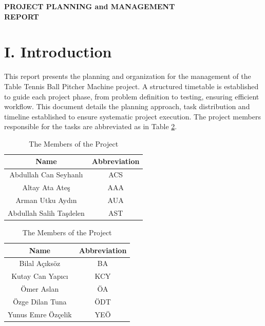 \documentclass[12pt]{article}
\begin{document}
\begin{center}
    \vspace{1em} %
    \textbf{\LARGE PROJECT PLANNING and MANAGEMENT \\
    \vspace{8pt}REPORT}\\
\end{center}


\section*{I. Introduction}
This report presents the planning and organization for the management of the Table Tennis Ball Pitcher Machine project. A structured timetable is established to guide each project phase, from problem definition to testing, ensuring efficient workflow. This document details the planning approach, task distribution and timeline established to ensure systematic project execution. The project members responsible for the tasks are abbreviated as in Table \ref{tab:teammembere}.

\begin{table}[h!]
\centering
\begin{minipage}{0.45\textwidth}
    \centering
    \begin{tabular}{|c|c|}
    \hline
    \textbf{Name} & \textbf{Abbreviation}\\
    \hline
    Abdullah Can Seyhanlı &  ACS\\
    Altay Ata Ateş & AAA\\
    Arman Utku Aydın & AUA\\
    Abdullah Salih Taşdelen &  AST\\
    \hline
    \end{tabular}

\end{minipage}%
\hfill
\begin{minipage}{0.45\textwidth}
    \centering
    \begin{tabular}{|c|c|}
    \hline
    \textbf{Name} & \textbf{Abbreviation} \\
    \hline
    Bilal Açıksöz & BA\\
    Kutay Can Yapıcı & KCY\\
    Ömer Aslan & ÖA\\
    Özge Dilan Tuna & ÖDT\\
    Yunus Emre Özçelik & YEÖ\\
    \hline
    \end{tabular}    
\end{minipage}
    \caption{The Members of the Project}
    \label{tab:teammembere}
\end{table}
\end{document}
